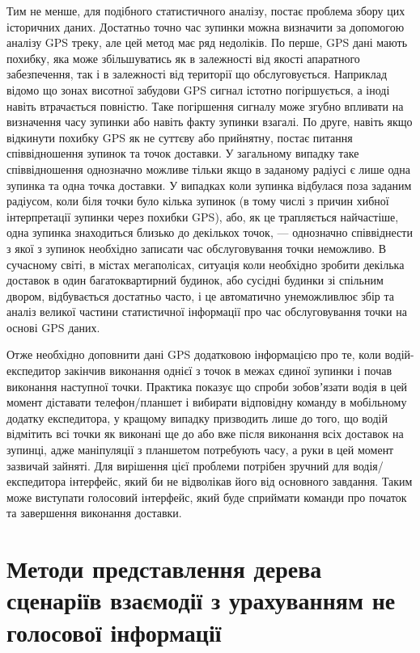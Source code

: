 Тим не менше, для подібного статистичного аналізу, постає проблема збору цих історичних даних. Достатньо точно час зупинки можна визначити за допомогою аналізу GPS треку, але цей метод має ряд недоліків. По перше, GPS дані мають похибку, яка може збільшуватись як в залежності від якості апаратного забезпечення, так і в залежності від території що обслуговується. Наприклад відомо що зонах висотної забудови GPS сигнал істотно погіршується, а іноді навіть втрачається повністю. Таке погіршення сигналу може згубно впливати на визначення часу зупинки або навіть факту зупинки взагалі. По друге, навіть якщо відкинути похибку GPS як не суттєву або прийнятну, постає питання співвідношення зупинок та точок доставки. У загальному випадку таке співвідношення однозначно можливе тільки якщо в заданому радіусі є лише одна зупинка та одна точка доставки. У випадках коли зупинка відбулася поза заданим радіусом, коли біля точки було кілька зупинок (в тому числі з причин хибної інтерпретації зупинки через похибки GPS), або, як це трапляється найчастіше, одна зупинка знаходиться близько до декількох точок, --- однозначно співвіднести з якої з зупинок необхідно записати час обслуговування точки неможливо. В сучасному світі, в містах мегаполісах, ситуація коли необхідно зробити декілька доставок в один багатоквартирний будинок, або сусідні будинки зі спільним двором, відбувається достатньо часто, і це автоматично унеможливлює збір та аналіз великої частини статистичної інформації про час обслуговування точки на основі GPS даних.

Отже необхідно доповнити дані GPS додатковою інформацією про те, коли водій-експедитор закінчив виконання однієї з точок в межах єдиної зупинки і почав виконання наступної точки. Практика показує що спроби зобовʼязати водія в цей момент діставати телефон/планшет і вибирати відповідну команду в мобільному додатку експедитора, у кращому випадку призводить лише до того, що водій відмітить всі точки як виконані ще до або вже після виконання всіх доставок на зупинці, адже маніпуляції з планшетом потребують часу, а руки в цей момент зазвичай зайняті. Для вирішення цієї проблеми потрібен зручний для водія/експедитора інтерфейс, який би не відволікав його від основного завдання. Таким може виступати голосовий інтерфейс, який буде сприймати команди про початок та завершення виконання доставки.


\section{Методи представлення дерева сценаріїв взаємодії з урахуванням не голосової інформації} \label{sect2_3}

